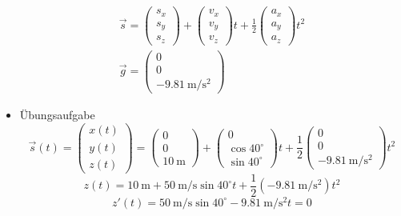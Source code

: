 \documentclass[a4paper, 12pt, onecolumn]{scrartcl}
\begin{document}
\begin{itemize}
  \begin{align}
    \vec{s} = \begin{pmatrix} s_x \\ s_y \\ s_z \end{pmatrix} + \begin{pmatrix} v_x \\ v_y \\ v_z \end{pmatrix} t + \frac{1}{2} \begin{pmatrix} a_x \\ a_y \\ a_z \end{pmatrix} t^2 \\
    \vec{g} = \begin{pmatrix} 0 \\ 0 \\ \SI{-9.81}{\meter\per\square\second} \end{pmatrix}
  \end{align}
  \item Übungsaufgabe \\
  \begin{equation}
    \vec{s} (t) = \begin{pmatrix} x (t) \\ y (t) \\ z (t) \end{pmatrix} =  \begin{pmatrix} 0 \\ 0 \\ \SI{10}{\meter} \end{pmatrix} + \begin{pmatrix} 0 \\ \cos 40^\circ \\ \sin 40^\circ \end{pmatrix} t + \frac{1}{2} \begin{pmatrix} 0 \\ 0 \\ \SI{-9.81}{\meter\per\square\second} \end{pmatrix} t^2
  \end{equation}
  \begin{equation}
    z (t) = \SI{10}{\meter} + \SI{50}{\meter\per\second} \sin 40^\circ t + \frac{1}{2} (\SI{-9.81}{\meter\per\square\second}) t^2
  \end{equation}
  \begin{equation}
    z' (t) = \SI{50}{\meter\per\second} \sin 40^\circ - \SI{9.81}{\meter\per\square\second} t = 0
  \end{equation}
  \end{itemize}
\end{document}
